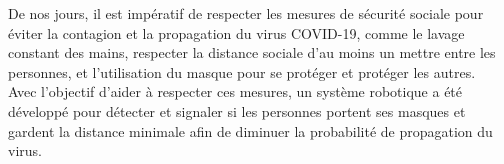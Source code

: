 \documentclass[letterpaper,oneside]{article}
\begin{document}
	
\templatePagecfg

\templateFinalcfg


\inserttitle


De nos jours, il est impératif de respecter les mesures de sécurité sociale pour éviter la contagion et la propagation du virus COVID-19, comme le lavage constant des mains, respecter la distance sociale d'au moins un mettre entre les personnes, et l'utilisation du masque pour se protéger et protéger les autres.\\

Avec l'objectif d'aider à respecter ces mesures, un système robotique a été développé pour détecter et signaler si les personnes portent ses masques et gardent la distance minimale afin de diminuer la probabilité de propagation du virus.


%

\end{document}

